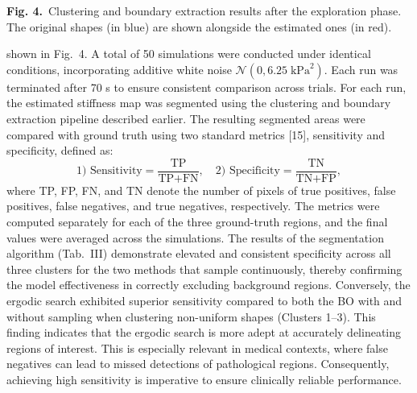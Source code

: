 \documentclass[11pt]{article}
\begin{document}
\vspace{0.8em}

\begin{center}
\end{center}

\vspace{0.4em}

\textbf{Fig. 4.}\ Clustering and boundary extraction results after
the exploration phase. The original shapes (in blue) are shown
alongside the estimated ones (in red).

\vspace{0.8em}

shown in Fig.~4. A total of 50 simulations were conducted under
identical conditions, incorporating additive white noise
$\mathcal{N}(0, 6.25\;\mathrm{kPa}^{2})$. Each run was terminated
after 70 s to ensure consistent comparison across trials. For each
run, the estimated stiffness map was segmented using the clustering
and boundary extraction pipeline described earlier. The resulting
segmented areas were compared with ground truth using two standard
metrics [15], sensitivity and specificity, defined as:
\[
\text{1) Sensitivity} = \frac{\text{TP}}{\text{TP}+\text{FN}},
\quad
\text{2) Specificity} = \frac{\text{TN}}{\text{TN}+\text{FP}},
\]
where TP, FP, FN, and TN denote the number of pixels of true
positives, false positives, false negatives, and true negatives,
respectively. The metrics were computed separately for each of the
three ground-truth regions, and the final values were averaged
across the simulations. The results of the segmentation algorithm
(Tab.~III) demonstrate elevated and consistent specificity across
all three clusters for the two methods that sample continuously,
thereby confirming the model effectiveness in correctly excluding
background regions. Conversely, the ergodic search exhibited
superior sensitivity compared to both the BO with and without
sampling when clustering non-uniform shapes (Clusters 1--3). This
finding indicates that the ergodic search is more adept at
accurately delineating regions of interest. This is especially
relevant in medical contexts, where false negatives can lead to
missed detections of pathological regions. Consequently, achieving
high sensitivity is imperative to ensure clinically reliable
performance.
\end{document}
